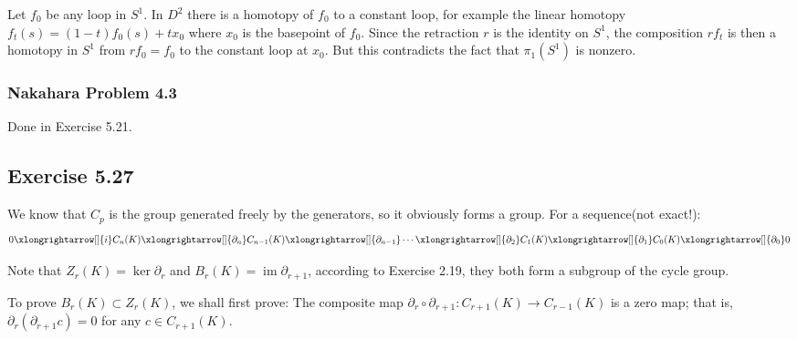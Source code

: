 \documentclass[]{ctexart}
\newcommand{\pa}{\partial}
\begin{document}
			Let $f_{0}$ be any loop in $S^{1} .$ In $D^{2}$ there is a homotopy of $f_{0}$ to a constant loop, for example the linear homotopy $f_{t}(s)=(1-t) f_{0}(s)+t x_{0}$ where $x_{0}$ is the basepoint of $f_{0} .$ Since the retraction $r$ is the identity on $S^{1}$, the composition $r f_{t}$ is then a homotopy in $S^{1}$ from $r f_{0}=f_{0}$ to the constant loop at $x_{0} .$ But this contradicts the fact that $\pi_{1}\left(S^{1}\right)$ is nonzero. 
			
		\subsubsection{Nakahara Problem 4.3}
			Done in Exercise 5.21. 
	
	\subsection{Exercise 5.27}
		We know that $C_p$ is the group generated freely by the generators, so it obviously forms a group.  For a sequence(not exact!):
			\begin{equation*}
			\begin{aligned}
				0\xlongrightarrow[]{i}C_n(K)\xlongrightarrow[]{\pa_n}C_{n-1}(K)\xlongrightarrow[]{\pa_{n-1}}\cdots\xlongrightarrow[]{\pa_2}C_1(K)\xlongrightarrow[]{\pa_1}C_0(K)\xlongrightarrow[]{\pa_0}0
			\end{aligned}
			\end{equation*}	
			
		Note that $Z_r(K)=\operatorname{ker}\pa_r$ and $B_r(K)=\operatorname{im}\pa_{r+1}$, according to Exercise 2.19, they both form a subgroup of the cycle group. 
		
		To prove $B_r(K)\subset Z_r(K)$, we shall first prove: The composite map $\partial_{r} \circ \partial_{r+1}: C_{r+1}(K) \rightarrow C_{r-1}(K)$ is a zero map; that is, $\partial_{r}\left(\partial_{r+1} c\right)=0$ for any $c \in C_{r+1}(K)$.
		
\end{document}
